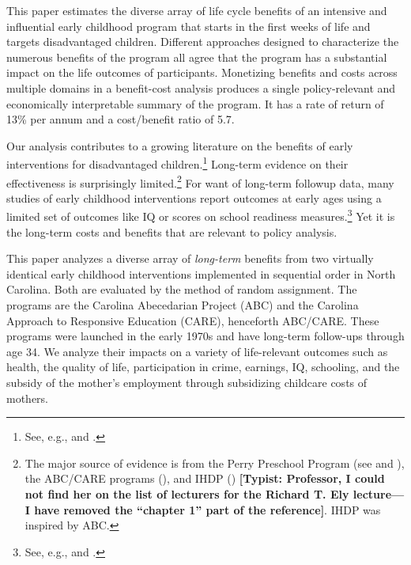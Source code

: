 This paper estimates the diverse array of life cycle benefits of an intensive and influential early childhood program that starts in the first weeks of life and targets disadvantaged children. Different approaches designed to characterize the numerous benefits of the program all agree that the program has a substantial impact on the life outcomes of participants. Monetizing benefits and costs across multiple domains in a benefit-cost analysis produces a single policy-relevant and economically interpretable summary of the program. It has a rate of return of 13\% per annum and a cost/benefit ratio of 5.7. 

Our analysis contributes to a growing literature on the benefits of early interventions for disadvantaged children.\footnote{See, e.g., \cite{Currie_2011_AER} and \cite{Elango_Hojman_etal_2016_Early-Edu}.} Long-term evidence on their effectiveness is surprisingly limited.\footnote{The major source of evidence is from the Perry Preschool Program (see \citealp{Schweinhart_Montie_ea_2005_BOOKlifetime} and \citealp{Heckman_Moon_etal_2010_RateofReturn,Heckman_Moon_etal_2010_QE}), the ABC/CARE programs (\citealp{Ramey_Campbell_etal_2000_ADS,Ramey-etal_2012-ABC}), and IHDP (\citealp{Gross_Spiker_etal_1997_BOOKHelpinglowbirth,Duncan_Sojourner_2013_JHR}) \textbf{[Typist: Professor, I could not find her on the list of lecturers for the Richard T. Ely lecture---I have removed the ``chapter 1'' part of the reference]}. IHDP was inspired by ABC.} For want of long-term followup data, many studies of early childhood interventions report outcomes at early ages using a limited set of outcomes like IQ or scores on school readiness measures.\footnote{See, e.g., \cite{Kline_Walters_2014_EvaluatingPublicPrograms} and \cite{Weiland_2013_CD_Impacts-of-Pre-K}.} Yet it is the long-term costs and benefits that are relevant to policy analysis.

This paper analyzes a diverse array of \emph{long-term} benefits from two virtually identical early childhood interventions implemented in sequential order in North Carolina. Both are evaluated by the method of random assignment. The programs are the Carolina Abecedarian Project (ABC) and the Carolina Approach to Responsive Education (CARE), henceforth ABC/CARE. These programs were launched in the early 1970s and have long-term follow-ups through age 34. We analyze their impacts on a variety of life-relevant outcomes such as health, the quality of life, participation in crime, earnings, IQ, schooling, and the subsidy of the mother's employment through subsidizing childcare costs of mothers.

